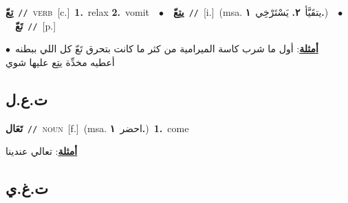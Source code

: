 \documentclass[10pt,a4paper,twoside]{article} %
\begin{document}
\begin{multicols}{2}
{{{{{{{{{{{{\setlength\topsep{0pt}\textbf{\foreignlanguage{arabic}{تِعّ}}\ {\color{gray}\texttt{//}\color{black}}\ \textsc{verb}\ [c.]\ \textbf{1.}~relax  \textbf{2.}~vomit\ \ $\bullet$\ \ \setlength\topsep{0pt}\textbf{\foreignlanguage{arabic}{يتِعّ}}\ {\color{gray}\texttt{//}\color{black}}\ [i.]\ \color{gray}(msa. \foreignlanguage{arabic}{يتقَيَّأ}~\foreignlanguage{arabic}{\textbf{٢.}}  \foreignlanguage{arabic}{يَسْتَرْخِي}~\foreignlanguage{arabic}{\textbf{١.}})\color{black}\ \ $\bullet$\ \ \setlength\topsep{0pt}\textbf{\foreignlanguage{arabic}{تَعّ}}\ {\color{gray}\texttt{//}\color{black}}\ [p.]\  \begin{flushright}\color{gray}\foreignlanguage{arabic}{\textbf{\underline{\foreignlanguage{arabic}{أمثلة}}}: أول ما شرب كاسة الميرامية من كثر ما كانت بتحرق تَعّ كل اللي ببطنه\ $\bullet$\ \  أعطيه مخدِّة يتِع عليها شوي}\end{flushright}\color{black}} \vspace{2mm}

\vspace{-3mm}
\subsection*{\color{blue}\foreignlanguage{arabic}{ت.ع.ل}\color{blue}{}} 

{\setlength\topsep{0pt}\textbf{\foreignlanguage{arabic}{تَعَال}}\ {\color{gray}\texttt{//}\color{black}}\ \textsc{noun}\ [f.]\ \color{gray}(msa. \foreignlanguage{arabic}{احضر}~\foreignlanguage{arabic}{\textbf{١.}})\color{black}\ \textbf{1.}~come\  \begin{flushright}\color{gray}\foreignlanguage{arabic}{\textbf{\underline{\foreignlanguage{arabic}{أمثلة}}}: تعالي عندينا}\end{flushright}\color{black}} \vspace{2mm}

\vspace{-3mm}
\subsection*{\color{blue}\foreignlanguage{arabic}{ت.غ.ي}\color{blue}{}} 

}}}}}}}}}}}
\end{multicols}
\end{document}
